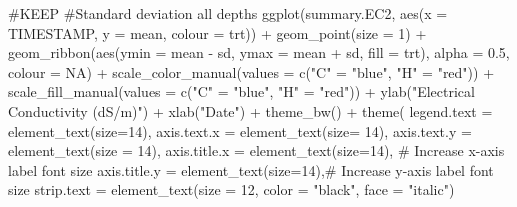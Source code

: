 \documentclass[
  letterpaper,
  DIV=11,
  numbers=noendperiod]{scrartcl}
\newenvironment{Shaded}{\begin{snugshade}}{\end{snugshade}}
\newcommand{\AttributeTok}[1]{\textcolor[rgb]{0.40,0.45,0.13}{#1}}
\newcommand{\CommentTok}[1]{\textcolor[rgb]{0.37,0.37,0.37}{#1}}
\newcommand{\ConstantTok}[1]{\textcolor[rgb]{0.56,0.35,0.01}{#1}}
\newcommand{\DecValTok}[1]{\textcolor[rgb]{0.68,0.00,0.00}{#1}}
\newcommand{\FloatTok}[1]{\textcolor[rgb]{0.68,0.00,0.00}{#1}}
\newcommand{\FunctionTok}[1]{\textcolor[rgb]{0.28,0.35,0.67}{#1}}
\newcommand{\NormalTok}[1]{\textcolor[rgb]{0.00,0.23,0.31}{#1}}
\newcommand{\OtherTok}[1]{\textcolor[rgb]{0.00,0.23,0.31}{#1}}
\newcommand{\SpecialCharTok}[1]{\textcolor[rgb]{0.37,0.37,0.37}{#1}}
\newcommand{\StringTok}[1]{\textcolor[rgb]{0.13,0.47,0.30}{#1}}
\begin{document}
\begin{Shaded}
\begin{Highlighting}[]
\CommentTok{\#KEEP}
\CommentTok{\#Standard deviation all depths}
\FunctionTok{ggplot}\NormalTok{(summary.EC2, }\FunctionTok{aes}\NormalTok{(}\AttributeTok{x =}\NormalTok{ TIMESTAMP, }\AttributeTok{y =}\NormalTok{ mean, }\AttributeTok{colour =}\NormalTok{ trt)) }\SpecialCharTok{+}
  \FunctionTok{geom\_point}\NormalTok{(}\AttributeTok{size =} \DecValTok{1}\NormalTok{) }\SpecialCharTok{+}
  \FunctionTok{geom\_ribbon}\NormalTok{(}\FunctionTok{aes}\NormalTok{(}\AttributeTok{ymin =}\NormalTok{ mean }\SpecialCharTok{{-}}\NormalTok{ sd, }\AttributeTok{ymax =}\NormalTok{ mean }\SpecialCharTok{+}\NormalTok{ sd, }\AttributeTok{fill =}\NormalTok{ trt), }\AttributeTok{alpha =} \FloatTok{0.5}\NormalTok{, }\AttributeTok{colour =} \ConstantTok{NA}\NormalTok{) }\SpecialCharTok{+}
  \FunctionTok{scale\_color\_manual}\NormalTok{(}\AttributeTok{values =} \FunctionTok{c}\NormalTok{(}\StringTok{"C"} \OtherTok{=} \StringTok{"blue"}\NormalTok{, }\StringTok{"H"} \OtherTok{=} \StringTok{"red"}\NormalTok{)) }\SpecialCharTok{+}
  \FunctionTok{scale\_fill\_manual}\NormalTok{(}\AttributeTok{values =} \FunctionTok{c}\NormalTok{(}\StringTok{"C"} \OtherTok{=} \StringTok{"blue"}\NormalTok{, }\StringTok{"H"} \OtherTok{=} \StringTok{"red"}\NormalTok{)) }\SpecialCharTok{+}
  \FunctionTok{ylab}\NormalTok{(}\StringTok{"Electrical Conductivity (dS/m)"}\NormalTok{) }\SpecialCharTok{+}
  \FunctionTok{xlab}\NormalTok{(}\StringTok{"Date"}\NormalTok{) }\SpecialCharTok{+}
  \FunctionTok{theme\_bw}\NormalTok{() }\SpecialCharTok{+}
  \FunctionTok{theme}\NormalTok{(}
    \AttributeTok{legend.text =} \FunctionTok{element\_text}\NormalTok{(}\AttributeTok{size=}\DecValTok{14}\NormalTok{),}
    \AttributeTok{axis.text.x =} \FunctionTok{element\_text}\NormalTok{(}\AttributeTok{size=} \DecValTok{14}\NormalTok{),}
    \AttributeTok{axis.text.y =} \FunctionTok{element\_text}\NormalTok{(}\AttributeTok{size =} \DecValTok{14}\NormalTok{),}
    \AttributeTok{axis.title.x =} \FunctionTok{element\_text}\NormalTok{(}\AttributeTok{size=}\DecValTok{14}\NormalTok{),  }\CommentTok{\# Increase x{-}axis label font size}
    \AttributeTok{axis.title.y =} \FunctionTok{element\_text}\NormalTok{(}\AttributeTok{size=}\DecValTok{14}\NormalTok{),}\CommentTok{\# Increase y{-}axis label font size}
    \AttributeTok{strip.text =} \FunctionTok{element\_text}\NormalTok{(}\AttributeTok{size =} \DecValTok{12}\NormalTok{, }\AttributeTok{color =} \StringTok{"black"}\NormalTok{, }\AttributeTok{face =} \StringTok{"italic"}\NormalTok{)}

\end{Highlighting}
\end{Shaded}
\end{document}
